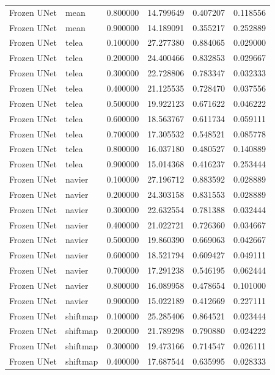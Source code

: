 \begin{table}[h]
\begin{tabular}{llrrrr}
Frozen UNet & mean & 0.800000 & 14.799649 & 0.407207 & 0.118556 \\
Frozen UNet & mean & 0.900000 & 14.189091 & 0.355217 & 0.252889 \\
Frozen UNet & telea & 0.100000 & 27.277380 & 0.884065 & 0.029000 \\
Frozen UNet & telea & 0.200000 & 24.400466 & 0.832853 & 0.029667 \\
Frozen UNet & telea & 0.300000 & 22.728806 & 0.783347 & 0.032333 \\
Frozen UNet & telea & 0.400000 & 21.125535 & 0.728470 & 0.037556 \\
Frozen UNet & telea & 0.500000 & 19.922123 & 0.671622 & 0.046222 \\
Frozen UNet & telea & 0.600000 & 18.563767 & 0.611734 & 0.059111 \\
Frozen UNet & telea & 0.700000 & 17.305532 & 0.548521 & 0.085778 \\
Frozen UNet & telea & 0.800000 & 16.037180 & 0.480527 & 0.140889 \\
Frozen UNet & telea & 0.900000 & 15.014368 & 0.416237 & 0.253444 \\
Frozen UNet & navier & 0.100000 & 27.196712 & 0.883592 & 0.028889 \\
Frozen UNet & navier & 0.200000 & 24.303158 & 0.831553 & 0.028889 \\
Frozen UNet & navier & 0.300000 & 22.632554 & 0.781388 & 0.032444 \\
Frozen UNet & navier & 0.400000 & 21.022721 & 0.726360 & 0.034667 \\
Frozen UNet & navier & 0.500000 & 19.860390 & 0.669063 & 0.042667 \\
Frozen UNet & navier & 0.600000 & 18.521794 & 0.609427 & 0.049111 \\
Frozen UNet & navier & 0.700000 & 17.291238 & 0.546195 & 0.062444 \\
Frozen UNet & navier & 0.800000 & 16.089958 & 0.478654 & 0.101000 \\
Frozen UNet & navier & 0.900000 & 15.022189 & 0.412669 & 0.227111 \\
Frozen UNet & shiftmap & 0.100000 & 25.285406 & 0.864521 & 0.023444 \\
Frozen UNet & shiftmap & 0.200000 & 21.789298 & 0.790880 & 0.024222 \\
Frozen UNet & shiftmap & 0.300000 & 19.473166 & 0.714547 & 0.026111 \\
Frozen UNet & shiftmap & 0.400000 & 17.687544 & 0.635995 & 0.028333 \\

\end{tabular}
\end{table}
